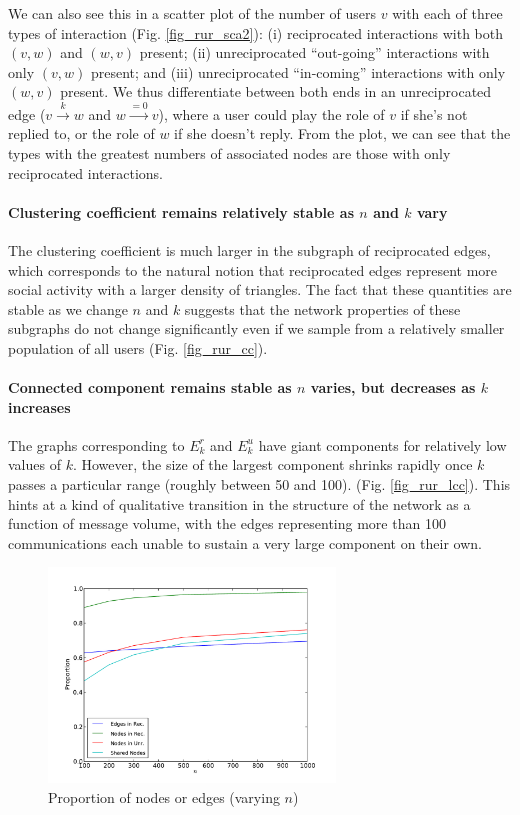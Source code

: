 \documentclass[conference]{IEEEtran}
\begin{document}
We can also see this in a scatter plot of the
number of users $v$ with each of three types of interaction (Fig. \ref{fig_rur_sca2}):
(i) reciprocated interactions with both $(v,w)$ and $(w,v)$ present;
(ii) unreciprocated ``out-going'' interactions with only $(v,w)$ present;
and 
(iii) unreciprocated ``in-coming'' interactions with only $(w,v)$ present.
We thus differentiate between both ends in an
unreciprocated edge ($v \xrightarrow{k} w$ and $w \xrightarrow{=0} v$),
where a user could play the role of $v$ if she's not replied to, 
or the role of $w$ if she doesn't reply.  
From the plot, we can see that the types with the greatest numbers of associated
nodes are those with only reciprocated interactions.

\paragraph*{Clustering coefficient remains relatively stable as $n$ and $k$ vary}
The clustering coefficient is much larger in the subgraph of reciprocated
edges, which corresponds to the natural notion that reciprocated 
edges represent more social activity with a larger density of triangles.
The fact that these quantities are stable as we change $n$ and $k$ suggests
that the network properties of these subgraphs do not change significantly even if we sample from a relatively smaller population of all users (Fig. \ref{fig_rur_cc}).

\paragraph*{Connected component remains stable as $n$ varies, but decreases as $k$ increases} 
The graphs corresponding to $E_k^r$ and $E_k^u$ have giant components
for relatively low values of $k$.
However, the size of the largest component shrinks rapidly once 
$k$ passes a particular range (roughly between 50 and 100).
(Fig. \ref{fig_rur_lcc}).
This hints at a kind of qualitative transition in the structure of the
network as a function of message volume, with the edges representing 
more than 100 communications each unable to sustain a very large
component on their own.

\begin{figure}[!t]
\centering
\includegraphics[width=3.0in]{proportion_edgesnodes_n}                
\caption{Proportion of nodes or edges (varying $n$)}
\label{fig_rur_propn}
\end{figure}
\end{document}
